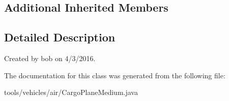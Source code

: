 \subsection*{Additional Inherited Members}


\subsection{Detailed Description}
Created by bob on 4/3/2016. 

The documentation for this class was generated from the following file\+:\begin{DoxyCompactItemize}
\item 
tools/vehicles/air/Cargo\+Plane\+Medium.\+java\end{DoxyCompactItemize}
